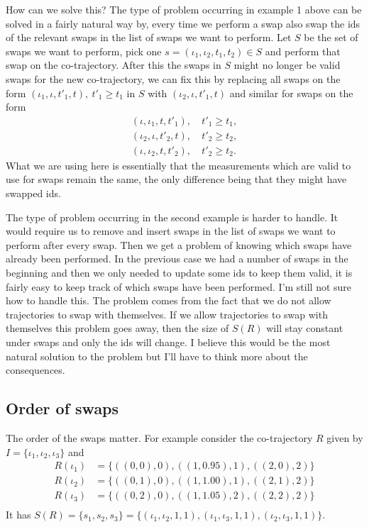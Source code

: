 \documentclass[11pt]{article}
\begin{document}
How can we solve this? The type of problem occurring in example 1
above can be solved in a fairly natural way by, every time we perform
a swap also swap the ids of the relevant swaps in the list of swaps we
want to perform. Let \(S\) be the set of swaps we want to perform,
pick one \(s = (\iota_1, \iota_2, t_1, t_2) \in S\) and perform that
swap on the co-trajectory. After this the swaps in \(S\) might no
longer be valid swaps for the new co-trajectory, we can fix this by
replacing all swaps on the form \((\iota_1, \iota, t'_1, t),\ t'_1
\geq t_1\) in \(S\) with \((\iota_2, \iota, t'_1, t)\) and similar for
swaps on the form
\begin{align}
  (\iota, \iota_1, t, t'_1), & \ t'_1 \geq t_1,\\
  (\iota_2, \iota, t'_2, t), & \ t'_2 \geq t_2,\\
  (\iota, \iota_2, t, t'_2), & \ t'_2 \geq t_2.
\end{align}
What we are using here is essentially that the measurements which are
valid to use for swaps remain the same, the only difference being that
they might have swapped ids.

The type of problem occurring in the second example is harder to
handle. It would require us to remove and insert swaps in the list of
swaps we want to perform after every swap. Then we get a problem of
knowing which swaps have already been performed. In the previous case
we had a number of swaps in the beginning and then we only needed to
update some ids to keep them valid, it is fairly easy to keep track of
which swaps have been performed. I'm still not sure how to handle
this. The problem comes from the fact that we do not allow
trajectories to swap with themselves. If we allow trajectories to swap
with themselves this problem goes away, then the size of \(S(R)\) will
stay constant under swaps and only the ids will change. I believe this
would be the most natural solution to the problem but I'll have to
think more about the consequences.
\subsection{Order of swaps}
\label{sec:org2cd5463}
The order of the swaps matter. For example consider the co-trajectory
\(R\) given by \(I = \{\iota_1, \iota_2, \iota_3\}\) and
\begin{align}
  R(\iota_1) &= \{((0, 0), 0), ((1, 0.95), 1), ((2, 0), 2)\}\\
  R(\iota_2) &= \{((0, 1), 0), ((1, 1.00), 1), ((2, 1), 2)\}\\
  R(\iota_3) &= \{((0, 2), 0), ((1, 1.05), 2), ((2, 2), 2)\}\\
\end{align}
It has \(S(R) = \{s_1, s_2, s_3\} = \{(\iota_1, \iota_2, 1, 1),
(\iota_1, \iota_3, 1, 1), (\iota_2, \iota_3, 1, 1)\}\).
\end{document}
